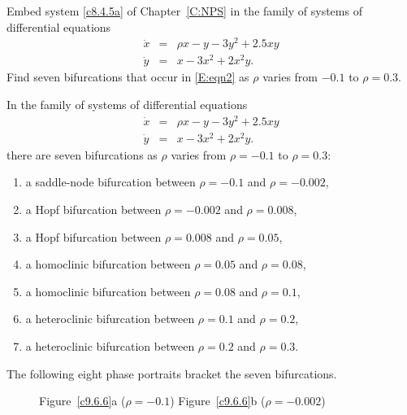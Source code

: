\documentclass{ximera}
\begin{document}
\begin{computerExercise} \label{c9.6.6}
Embed system \eqref{c8.4.5a} of Chapter~\ref{C:NPS} in the family of systems of 
differential equations 
\begin{equation} \label{E:eqn2}
\begin{array}{rcl}
\dot{x} & = & \rho x-y-3y^2+2.5xy\\
\dot{y} & = & x-3x^2+2x^2y.
\end{array}
\end{equation}
Find seven bifurcations that occur in \eqref{E:eqn2} as $\rho$ varies from 
$-0.1$ to $\rho=0.3$. 

\begin{solution}

\soln In the family of systems of differential equations  
\[
\begin{array}{rcl}
\dot{x} & = & \rho x-y-3y^2+2.5xy\\
\dot{y} & = & x-3x^2+2x^2y.
\end{array}
\]
there are seven bifurcations as $\rho$ varies from $\rho=-0.1$ to $\rho=0.3$:  
\begin{enumerate}
\item	a saddle-node bifurcation between $\rho=-0.1$ and $\rho=-0.002$,
\item	a Hopf bifurcation between $\rho=-0.002$ and $\rho=0.008$,
\item	a Hopf bifurcation between $\rho=0.008$ and $\rho=0.05$,
\item	a homoclinic bifurcation between $\rho=0.05$ and $\rho=0.08$,
\item	a homoclinic bifurcation between $\rho=0.08$ and $\rho=0.1$,
\item	a heteroclinic bifurcation between $\rho=0.1$ and $\rho=0.2$,
\item	a heteroclinic bifurcation between $\rho=0.2$ and $\rho=0.3$.
\end{enumerate}
The following eight phase portraits bracket the seven bifurcations.
\begin{figure}[htb]
     \centerline{%
     }
     \centerline{Figure~\ref{c9.6.6}a ($\rho = -0.1$)\hspace{1.3in} Figure~\ref{c9.6.6}b ($\rho = -0.002$)}
\end{figure}
\begin{figure}[htb]
     \centerline{%
     }

\end{figure}
\end{solution}
\end{computerExercise}
\end{document}
